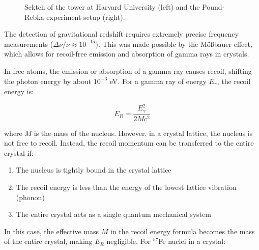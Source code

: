 \documentclass[
  a4paper,
]{book}
\providecommand{\tightlist}{%
  \setlength{\itemsep}{0pt}\setlength{\parskip}{0pt}}
\begin{document}
\begin{figure}
\begin{minipage}{0.50\linewidth}
\end{minipage}%

\caption{\label{fig-pound_rebka2}Sektch of the tower at Harvard
University (left) and the Pound-Rebka experiment setup (right).}

\end{figure}%

\begin{tcolorbox}[enhanced jigsaw, coltitle=black, title=\textcolor{quarto-callout-note-color}{\faInfo}\hspace{0.5em}{The Mößbauer Effect in the Pound-Rebka Experiment}, colframe=quarto-callout-note-color-frame, toprule=.15mm, opacitybacktitle=0.6, left=2mm, opacityback=0, breakable, toptitle=1mm, bottomtitle=1mm, leftrule=.75mm, arc=.35mm, titlerule=0mm, colbacktitle=quarto-callout-note-color!10!white, rightrule=.15mm, bottomrule=.15mm, colback=white]

The detection of gravitational redshift requires extremely precise
frequency measurements (\(\Delta \nu/\nu \approx 10^{-15}\)). This was
made possible by the Mößbauer effect, which allows for recoil-free
emission and absorption of gamma rays in crystals.

In free atoms, the emission or absorption of a gamma ray causes recoil,
shifting the photon energy by about \(10^{-3}\) eV. For a gamma ray of
energy \(E_\gamma\), the recoil energy is:

\[E_R = \frac{E_\gamma^2}{2Mc^2}\]

where \(M\) is the mass of the nucleus. However, in a crystal lattice,
the nucleus is not free to recoil. Instead, the recoil momentum can be
transferred to the entire crystal if:

\begin{enumerate}
\def\labelenumi{\arabic{enumi}.}
\tightlist
\item
  The nucleus is tightly bound in the crystal lattice
\item
  The recoil energy is less than the energy of the lowest lattice
  vibration (phonon)
\item
  The entire crystal acts as a single quantum mechanical system
\end{enumerate}

In this case, the effective mass \(M\) in the recoil energy formula
becomes the mass of the entire crystal, making \(E_R\) negligible. For
\(^{57}\)Fe nuclei in a crystal:


\end{tcolorbox}
\end{document}
